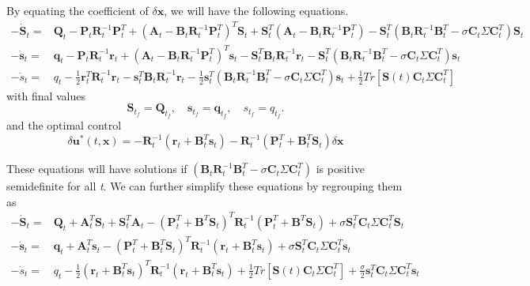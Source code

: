\documentclass[letterpaper, 10 pt, conference]{ieeeconf}
\newcommand{\vq}{\mathbf q}
\newcommand{\vr}{\mathbf r}
\newcommand{\vs}{\mathbf s}
\newcommand{\vu}{\mathbf u}
\newcommand{\vx}{\mathbf x}
\newcommand{\vA}{\mathbf A}
\newcommand{\vB}{\mathbf B}
\newcommand{\vC}{\mathbf C}
\newcommand{\vP}{\mathbf P}
\newcommand{\vQ}{\mathbf Q}
\newcommand{\vR}{\mathbf R}
\newcommand{\vS}{\mathbf S}
\begin{document}
By equating the coefficient of $\delta\vx$, we will have the following equations.
\begin{align}
-\dot{\vS}_t =& \vQ_{t} -\vP_t \vR_t^{-1} \vP_t^T + \left( \vA_t - \vB_t \vR_t^{-1} \vP_t^T \right)^T\vS_t + \vS_t^T \left( \vA_t - \vB_t \vR_t^{-1} \vP_t^T \right) - \vS_t^T \left( \vB_t\vR_t^{-1}\vB_t^T -\sigma \vC_t\Sigma\vC_t^T \right) \vS_t \\
-\dot{\vs}_t =& \vq_{t} - \vP_t \vR_t^{-1} \vr_t + \left( \vA_t - \vB_t \vR_t^{-1} \vP^T_t \right)^T \vs_t - \vS_t^T \vB_t \vR_t^{-1} \vr_t - \vS_t^T \left( \vB_t\vR_t^{-1}\vB_t^T -\sigma \vC_t\Sigma\vC_t^T \right) \vs_t  \\
-\dot{s}_t =& q_{t} - \frac{1}{2} \vr_t^T \vR_t^{-1} \vr_t - \vs_t^T \vB_t \vR_t^{-1} \vr_t - \frac{1}{2} \vs_t^T \left( \vB_t\vR_t^{-1}\vB_t^T -\sigma \vC_t\Sigma\vC_t^T \right) \vs_t + \frac{1}{2} Tr\left[ \vS(t) \vC_t\Sigma\vC_t^T \right]  
\end{align}
with final values
\begin{equation}
\vS_{t_f} = \vQ_{t_f}, \quad 
\vs_{t_f} = \vq_{t_f}, \quad
  s_{t_f} = q_{t_f}. 
\end{equation}
and the optimal control
\begin{equation}
\delta\vu^*(t,\vx) = - \vR_t^{-1} \left( \vr_t + \vB_t^T \vs_t \right)
- \vR_t^{-1} \left( \vP_t^T + \vB_t^T \vS_t \right) \delta\vx
\end{equation}


These equations will have solutions if $\left( \vB_t\vR_t^{-1}\vB_t^T -\sigma
\vC_t\Sigma\vC_t^T \right)$ is positive semidefinite for all \textit{t}. We
can further simplify these equations by regrouping them as
\begin{align}
-\dot{\vS}_t =& \vQ_{t} + \vA_t^T \vS_t + \vS_t^T \vA_t - \left( \vP_t^T + \vB^T \vS_t \right)^T \vR_t^{-1} \left( \vP_t^T + \vB^T \vS_t \right) + \sigma \vS_t^T \vC_t\Sigma\vC_t^T \vS_t \\
-\dot{\vs}_t =& \vq_{t} + \vA_t^T \vs_t - \left( \vP_t^T + \vB_t^T \vS_t \right)^T \vR_t^{-1} \left( \vr_t + \vB_t^T \vs_t \right) + \sigma  \vS_t^T \vC_t\Sigma\vC_t^T \vs_t  \\
-\dot{s}_t =& q_{t} - \frac{1}{2} \left( \vr_t + \vB_t^T \vs_t \right)^T \vR_t^{-1} \left( \vr_t + \vB_t^T \vs_t \right) + \frac{1}{2} Tr\left[ \vS(t) \vC_t\Sigma\vC_t^T \right] + \frac{\sigma}{2} \vs_t^T \vC_t\Sigma\vC_t^T \vs_t  
\end{align}
\end{document}
